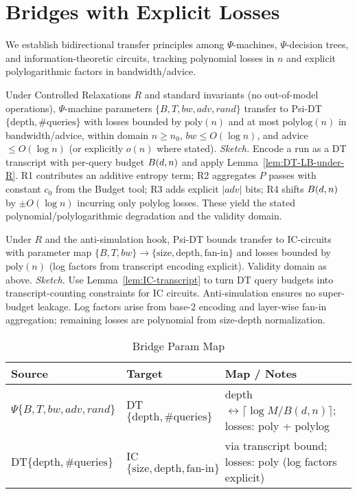 \section{Bridges with Explicit Losses}

We establish bidirectional transfer principles among $\Psi$-machines, $\Psi$-decision trees, and information-theoretic circuits, tracking polynomial losses in $n$ and explicit polylogarithmic factors in bandwidth/advice.

\begin{theorem}\label{thm:bridge-machine-tree}
Under Controlled Relaxations $R$ and standard invariants (no out-of-model operations), $\Psi$-machine parameters $\{B,T,bw,adv,rand\}$ transfer to Psi-DT $\{\mathrm{depth},\#\mathrm{queries}\}$ with losses bounded by $\mathrm{poly}(n)$ and at most $\mathrm{polylog}(n)$ in bandwidth/advice, within domain $n\ge n_0$, $bw\le O(\log n)$, and advice $\le O(\log n)$ (or explicitly $o(n)$ where stated).
\emph{Sketch.} Encode a run as a DT transcript with per-query budget $\B(d,n)$ and apply Lemma~\ref{lem:DT-LB-under-R}. R1 contributes an additive entropy term; R2 aggregates $P$ passes with constant $c_0$ from the Budget tool; R3 adds explicit $|adv|$ bits; R4 shifts $\B(d,n)$ by $\pm O(\log n)$ incurring only polylog losses. These yield the stated polynomial/polylogarithmic degradation and the validity domain.
\end{theorem}

\begin{theorem}\label{thm:bridge-tree-circuit}
Under $R$ and the anti-simulation hook, Psi-DT bounds transfer to IC-circuits with parameter map $\{B,T,bw\}\to\{\text{size},\text{depth},\text{fan-in}\}$ and losses bounded by $\mathrm{poly}(n)$ (log factors from transcript encoding explicit). Validity domain as above.
\emph{Sketch.} Use Lemma~\ref{lem:IC-transcript} to turn DT query budgets into transcript-counting constraints for IC circuits. Anti-simulation ensures no super-budget leakage. Log factors arise from base-2 encoding and layer-wise fan-in aggregation; remaining losses are polynomial from size-depth normalization.
\end{theorem}

\begin{table}[t]
\centering
\caption{Bridge Param Map}
\begin{tabular}{lll}
\toprule
Source & Target & Map / Notes \\
\midrule
$\Psi\{B,T,bw,adv,rand\}$ & DT$\{\mathrm{depth},\#\mathrm{queries}\}$ & depth $\leftrightarrow \lceil \log M / B(d,n)\rceil$; losses: poly + polylog \\
DT$\{\mathrm{depth},\#\mathrm{queries}\}$ & IC$\{\text{size},\text{depth},\text{fan-in}\}$ & via transcript bound; losses: poly (log factors explicit) \\
\bottomrule
\end{tabular}
\end{table}